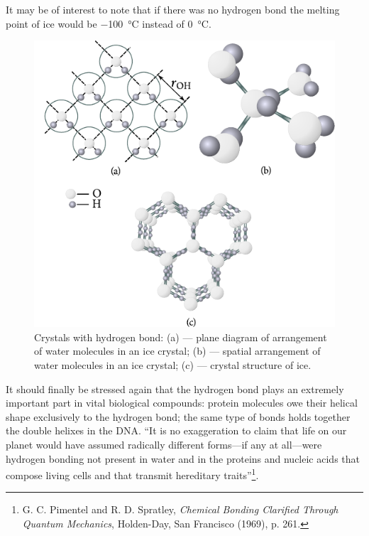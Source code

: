 It may be of interest to note that if there was no hydrogen bond the melting point of ice would be \SI{-100}{\degreeCelsius} instead of \SI{0}{\degreeCelsius}.

\begin{figure}[t]
	\begin{center}
		\includegraphics[scale=1.0]{figures/ch_01/fig_1_23.pdf}
		\caption[]{Crystals with hydrogen bond: (a) --- plane diagram of arrangement of water molecules in an ice crystal; (b) --- spatial arrangement of water molecules in an ice crystal; (c) --- crystal structure of ice.}
		\label{fig:1_23}
	\end{center}
	\vspace{-0.7cm}
\end{figure}

It should finally be stressed again that the hydrogen bond plays an extremely important part in vital biological compounds: protein molecules owe their helical shape exclusively to the hydrogen bond; the same type of bonds holds together the double helixes in the DNA. ``It is no exaggeration to claim that life on our planet would have assumed radically different forms---if any at all---were hydrogen bonding not present in water and in the proteins and nucleic acids that compose living cells and that transmit hereditary traits''\footnote{G. C. Pimentel and R. D. Spratley, \textit{Chemical Bonding Clarified Through Quantum Mechanics}, Holden-Day, San Francisco (1969), p. 261.}.

